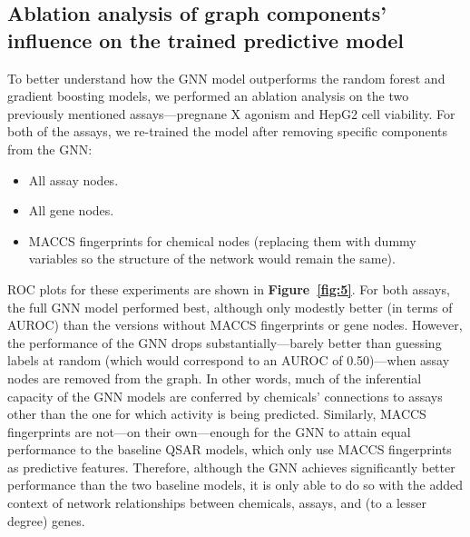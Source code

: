 \documentclass{ws-procs11x85}
\begin{document}
\subsection{Ablation analysis of graph components' influence on the trained predictive model}
To better understand how the GNN model outperforms the random forest and gradient boosting models, we performed an ablation analysis on the two previously mentioned assays---pregnane X agonism and HepG2 cell viability.
For both of the assays, we re-trained the model after removing specific components from the GNN:
\begin{itemize}
   \item All assay nodes.
   \item All gene nodes.
   \item MACCS fingerprints for chemical nodes (replacing them with dummy variables so the structure of the network would remain the same).
\end{itemize}
ROC plots for these experiments are shown in \textbf{Figure~\ref{fig:5}}.
For both assays, the full GNN model performed best, although only modestly better (in terms of AUROC) than the versions without MACCS fingerprints or gene nodes.
However, the performance of the GNN drops substantially---barely better than guessing labels at random (which would correspond to an AUROC of 0.50)---when assay nodes are removed from the graph.
In other words, much of the inferential capacity of the GNN models are conferred by chemicals' connections to assays other than the one for which activity is being predicted.
Similarly, MACCS fingerprints are not---on their own---enough for the GNN to attain equal performance to the baseline QSAR models, which only use MACCS fingerprints as predictive features.
Therefore, although the GNN achieves significantly better performance than the two baseline models, it is only able to do so with the added context of network relationships between chemicals, assays, and (to a lesser degree) genes.
\end{document}
